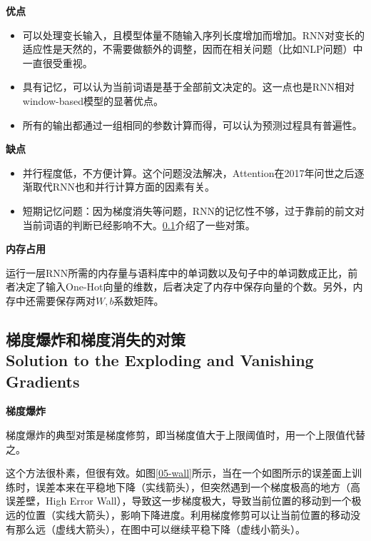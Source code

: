 \textbf{优点}

\begin{itemize}
    \item 可以处理变长输入，且模型体量不随输入序列长度增加而增加。RNN对变长的适应性是天然的，不需要做额外的调整，因而在相关问题（比如NLP问题）中一直很受重视。
    \item 具有记忆，可以认为当前词语是基于全部前文决定的。这一点也是RNN相对window-based模型的显著优点。
    \item 所有的输出都通过一组相同的参数计算而得，可以认为预测过程具有普遍性。
\end{itemize}

\textbf{缺点}

\begin{itemize}
    \item 并行程度低，不方便计算。这个问题没法解决，Attention在2017年问世之后逐渐取代RNN也和并行计算方面的因素有关。
    \item 短期记忆问题：因为梯度消失等问题，RNN的记忆性不够，过于靠前的前文对当前词语的判断已经影响不大。\ref{05-solution-vanish}介绍了一些对策。
\end{itemize}

\textbf{内存占用}

运行一层RNN所需的内存量与语料库中的单词数以及句子中的单词数成正比，前者决定了输入One-Hot向量的维数，后者决定了内存中保存向量的个数。另外，内存中还需要保存两对$W, b$系数矩阵。

\subsection{梯度爆炸和梯度消失的对策 \\ Solution to the Exploding and Vanishing Gradients}
\label{05-solution-vanish}

\textbf{梯度爆炸}

梯度爆炸的典型对策是梯度修剪，即当梯度值大于上限阈值时，用一个上限值代替之。

这个方法很朴素，但很有效。如图\ref{05-wall}所示，当在一个如图所示的误差面上训练时，误差本来在平稳地下降（实线箭头），但突然遇到一个梯度极高的地方（高误差壁，High Error Wall），导致这一步梯度极大，导致当前位置的移动到一个极远的位置（实线大箭头），影响下降进度。利用梯度修剪可以让当前位置的移动没有那么远（虚线大箭头），在图中可以继续平稳下降（虚线小箭头）。


